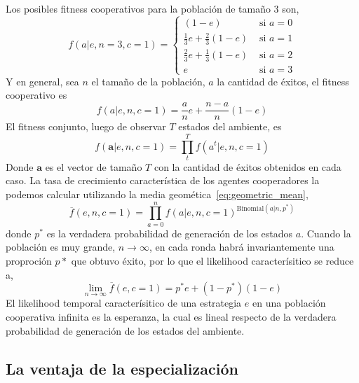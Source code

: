\documentclass[a4paper,10pt]{article}
\begin{document}
{Los posibles fitness cooperativos para la población de tamaño 3 son,
%
\begin{equation}
f(a|e,n=3,c=1) =
\begin{cases}
(1-e) & \text{ si } a = 0 \\
\frac{1}{3} e + \frac{2}{3} (1-e)  & \text{ si } a = 1 \\
\frac{2}{3} e + \frac{1}{3} (1-e)    & \text{ si } a = 2 \\
e & \text{ si } a = 3
\end{cases}
\end{equation}
%
Y en general, sea $n$ el tamaño de la población, $a$ la cantidad de éxitos, el fitness cooperativo es
\begin{equation}\label{eq:fitness_cooperador}
f(a|e,n,c=1) = \frac{a}{n} e + \frac{n-a}{n}(1-e)
\end{equation}
%
El fitness conjunto, luego de observar $T$ estados del ambiente, es
%
\begin{equation}
f(\bm{a}|e,n,c=1) = \prod^T_t f(a^t|e,n,c=1)
\end{equation}
%
Donde $\bm{a}$ es el vector de tamaño $T$ con la cantidad de éxitos obtenidos en cada caso.
La tasa de crecimiento característica de los agentes cooperadores la podemos calcular utilizando la media geomética~\ref{eq:geometric_mean},
%
\begin{equation}
\overline{f}(e,n,c=1) = \prod_{a=0}^n f(a|e,n,c=1)^{\text{Binomial}(a|n,p^*)}
\end{equation}
%
donde $p^*$ es la verdadera probabilidad de generación de los estados $a$.
Cuando la población es muy grande, $n\rightarrow \infty$, en cada ronda habrá invariantemente una proproción $p*$ que obtuvo éxito, por lo que el likelihood caracterísitico se reduce a,
%
\begin{equation}
\lim_{n\rightarrow \infty} \overline{f}(e,c=1) = p^* e + (1-p^*)(1-e)
\end{equation}
%
El likelihood temporal caracterísitico de una estrategia $e$ en una población cooperativa infinita es la esperanza, la cual es lineal respecto de la verdadera probabilidad de generación de los estados del ambiente.


\subsection{La ventaja de la especialización}

}
\end{document}
